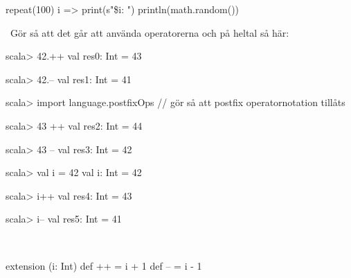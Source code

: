 \SubtaskSolved
\begin{Code}
repeat(100){ i =>
  print(s"\$i: ")
  println(math.random())
}
\end{Code}



\QUESTEND



\QUESTBEGIN

\Task \what~Gör så att det går att använda operatorerna \code{++} och \code{--} på heltal så här:
\begin{REPLnonum}
scala> 42.++
val res0: Int = 43
                                                                                                                               
scala> 42.--
val res1: Int = 41
                                                                                                                               
scala> import language.postfixOps    // gör så att postfix operatornotation tillåts
                                                                                                                               
scala> 43 ++
val res2: Int = 44
                                                                                                                               
scala> 43 --
val res3: Int = 42

scala> val i = 42
val i: Int = 42
                                                                                                                               
scala> i++
val res4: Int = 43
                                                                                                                               
scala> i--
val res5: Int = 41
\end{REPLnonum}

\SOLUTION

\TaskSolved \what~

\begin{Code}
extension (i: Int)
  def ++ = i + 1
  def -- = i - 1
\end{Code}


\QUESTEND





\QUESTBEGIN


